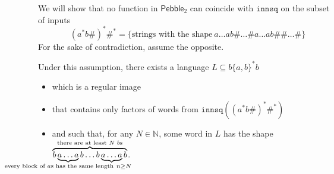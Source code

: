 \documentclass{fundam}
\newcommand{\bbN}{\mathbb{N}}
\newcommand{\Pebble}{\mathsf{Pebble}}
\theoremstyle{claimstyle}
\newcommand\innsq{\mathtt{innsq}}
\begin{document}
We will show that no function in $\Pebble_2$ can coincide with $\innsq$ on the subset of inputs
\[ (a^*b\#)^* \#^* = \{\text{strings with the shape}\ a\dots ab\# \dots \# a\dots ab \#\# \dots \#\} \]
For the sake of contradiction, assume the opposite.
\begin{claim}\label{clm:reg-image-right-shape}
  Under this assumption, there exists a language $L \subseteq b\{a,b\}^*b$
  \begin{itemize}
    \item which is a regular image
    \item that contains only factors of words from $\innsq((a^*b\#)^*\#^*)$
    \item and such that, for any $N\in\bbN$, some word in $L$ has the shape
      $\overbrace{b\underbrace{a \dots a}_{\mathclap{\text{every block of $a$s
              has the same length}\ n\geq N}} b \dots b\underbrace{a \dots a}b}^{\mathclap{\text{there are at least $N$ $b$s}}}$.
  \end{itemize}
\end{claim}
\end{document}

